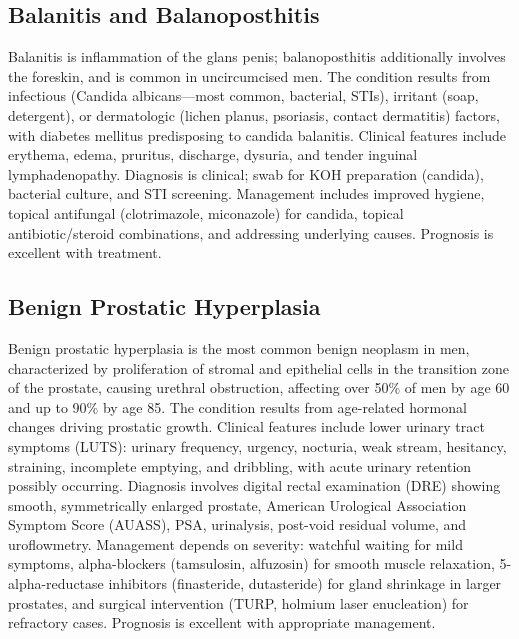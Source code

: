 \subsection{Balanitis and Balanoposthitis}
\label{sec:Balanitis and Balanoposthitis}
Balanitis is inflammation of the glans penis; balanoposthitis additionally involves the foreskin, and is common in uncircumcised men. The condition results from infectious (Candida albicans---most common, bacterial, STIs), irritant (soap, detergent), or dermatologic (lichen planus, psoriasis, contact dermatitis) factors, with diabetes mellitus predisposing to candida balanitis. Clinical features include erythema, edema, pruritus, discharge, dysuria, and tender inguinal lymphadenopathy. Diagnosis is clinical; swab for KOH preparation (candida), bacterial culture, and STI screening. Management includes improved hygiene, topical antifungal (clotrimazole, miconazole) for candida, topical antibiotic/steroid combinations, and addressing underlying causes. Prognosis is excellent with treatment.

\subsection{Benign Prostatic Hyperplasia}
\label{sec:Benign Prostatic Hyperplasia}
Benign prostatic hyperplasia is the most common benign neoplasm in men, characterized by proliferation of stromal and epithelial cells in the transition zone of the prostate, causing urethral obstruction, affecting over 50\% of men by age 60 and up to 90\% by age 85. The condition results from age-related hormonal changes driving prostatic growth. Clinical features include lower urinary tract symptoms (LUTS): urinary frequency, urgency, nocturia, weak stream, hesitancy, straining, incomplete emptying, and dribbling, with acute urinary retention possibly occurring. Diagnosis involves digital rectal examination (DRE) showing smooth, symmetrically enlarged prostate, American Urological Association Symptom Score (AUASS), PSA, urinalysis, post-void residual volume, and uroflowmetry. Management depends on severity: watchful waiting for mild symptoms, alpha-blockers (tamsulosin, alfuzosin) for smooth muscle relaxation, 5-alpha-reductase inhibitors (finasteride, dutasteride) for gland shrinkage in larger prostates, and surgical intervention (TURP, holmium laser enucleation) for refractory cases. Prognosis is excellent with appropriate management.


